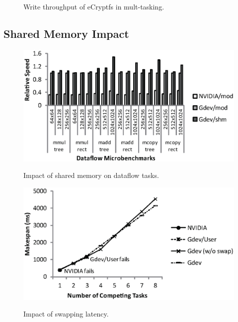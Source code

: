\begin{figure}[t]
\begin{center}
  \vspace{-1.5em}
  \caption{Write throughput of eCryptfs in mult-tasking.}
  \label{fig:memcpy}
 \end{center}
 \vspace{-2em}
\end{figure}

\subsection{Shared Memory Impact}

\begin{figure}[t]
 \begin{center}
  \includegraphics[width=\hsize]{eps/dataflow.eps}\\
  \vspace{-1.5em}
  \caption{Impact of shared memory on dataflow tasks.}
  \label{fig:dataflow}
 \end{center}
 \begin{center}
  \includegraphics[width=\hsize]{eps/swapping.eps}\\
  \vspace{-1.5em}
  \caption{Impact of swapping latency.}
  \label{fig:swapping}
 \end{center}
  \vspace{-2em}
\end{figure}

